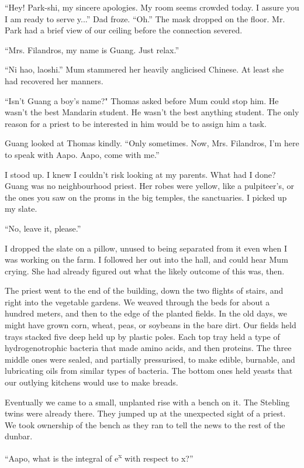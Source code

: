 ``Hey! Park-shi, my sincere apologies. My room seems crowded today. I assure you I am ready to serve y...'' Dad froze. ``Oh.'' The mask dropped on the floor. Mr. Park had a brief view of our ceiling before the connection severed.

``Mrs. Filandros, my name is Guang. Just relax.''

``Ni hao, laoshi.'' Mum stammered her heavily anglicised Chinese. At least she had recovered her manners.

``Isn't Guang a boy's name?" Thomas asked before Mum could stop him. He wasn't the best Mandarin student. He wasn't the best anything student. The only reason for a priest to be interested in him would be to assign him a task.

Guang looked at Thomas kindly. ``Only sometimes. Now, Mrs. Filandros, I'm here to speak with Aapo. Aapo, come with me.''

I stood up. I knew I couldn't risk looking at my parents. What had I done? Guang was no neighbourhood priest. Her robes were yellow, like a pulpiteer's, or the ones you saw on the proms in the big temples, the sanctuaries. I picked up my slate.

``No, leave it, please.''

I dropped the slate on a pillow, unused to being separated from it even when I was working on the farm. I followed her out into the hall, and could hear Mum crying. She had already figured out what the likely outcome of this was, then.

The priest went to the end of the building, down the two flights of stairs, and right into the vegetable gardens. We weaved through the beds for about a hundred meters, and then to the edge of the planted fields. In the old days, we might have grown corn, wheat, peas, or soybeans in the bare dirt. Our fields held trays stacked five deep held up by plastic poles. Each top tray held a type of hydrogenotrophic bacteria that made amino acids, and then proteins. The three middle ones were sealed, and partially pressurised, to make edible, burnable, and lubricating oils from similar types of bacteria. The bottom ones held yeasts that our outlying kitchens would use to make breads.

Eventually we came to a small, unplanted rise with a bench on it. The Stebling twins were already there. They jumped up at the unexpected sight of a priest. We took ownership of the bench as they ran to tell the news to the rest of the dunbar.

``Aapo, what is the integral of e\textsuperscript{x} with respect to x?''

